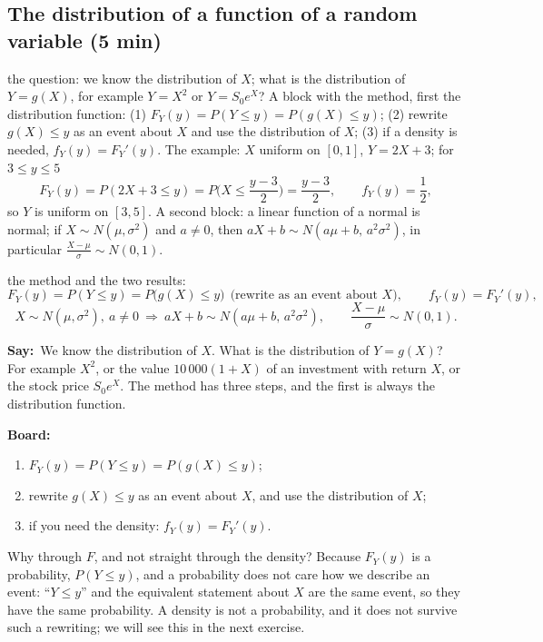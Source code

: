 \documentclass[11pt,a4paper,parskip=half]{scrartcl}
\renewcommand{\needspace}[1]{\Needspace{6\baselineskip}}
\newcommand{\say}{\textbf{\color{teal}Say:}\ }
\newcommand{\board}{\textbf{\color{gold}Board:}\ }
\begin{document}
\needspace{0.4\textheight}
\subsection{The distribution of a function of a random variable (5 min)}

\begin{onslide}
	the question: we know the distribution of $X$; what is the distribution
	of $Y=g(X)$, for example $Y=X^2$ or $Y=S_0e^X$? A block with the method,
	first the distribution function: (1) $F_Y(y)=P(Y\le y)=P(g(X)\le y)$;
	(2) rewrite $g(X)\le y$ as an event about $X$ and use the distribution of
	$X$; (3) if a density is needed, $f_Y(y)=F_Y'(y)$. The example: $X$
	uniform on $[0,1]$, $Y=2X+3$; for $3\le y\le5$
	\[ F_Y(y)=P(2X+3\le y)=P\Big(X\le\frac{y-3}{2}\Big)=\frac{y-3}{2},\qquad
		f_Y(y)=\frac12, \]
	so $Y$ is uniform on $[3,5]$. A second block: a linear function of a
	normal is normal; if $X\sim N(\mu,\sigma^2)$ and $a\ne0$, then
	$aX+b\sim N(a\mu+b,\,a^2\sigma^2)$, in particular
	$\frac{X-\mu}{\sigma}\sim N(0,1)$.
\end{onslide}

\begin{printeq}
\begin{slidefig}
	the method and the two results:
	\[ F_Y(y)=P(Y\le y)=P\big(g(X)\le y\big)\ \ \text{(rewrite as an event
		about $X$)},\qquad f_Y(y)=F_Y'(y), \]
	\[ X\sim N(\mu,\sigma^2),\ a\ne0\ \Longrightarrow\
		aX+b\sim N(a\mu+b,\,a^2\sigma^2),\qquad
		\frac{X-\mu}{\sigma}\sim N(0,1). \]
\end{slidefig}
\end{printeq}

\say We know the distribution of $X$. What is the distribution of
$Y=g(X)$? For example $X^2$, or the value $10\,000(1+X)$ of an investment
with return $X$, or the stock price $S_0e^X$. The method has three steps,
and the first is always the distribution function.

\board
\begin{enumerate}[nosep]
	\item $F_Y(y)=P(Y\le y)=P(g(X)\le y)$;
	\item rewrite $g(X)\le y$ as an event about $X$, and use the
	      distribution of $X$;
	\item if you need the density: $f_Y(y)=F_Y'(y)$.
\end{enumerate}

Why through $F$, and not straight through the density? Because $F_Y(y)$
is a probability, $P(Y\le y)$, and a probability does not care how we
describe an event: ``$Y\le y$'' and the equivalent statement about $X$
are the same event, so they have the same probability. A density is not a
probability, and it does not survive such a rewriting; we will see this in
the next exercise.
\end{document}
